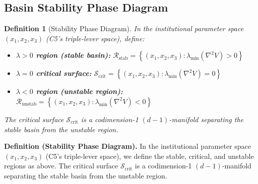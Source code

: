 \documentclass[12pt,a4paper]{article}
\newtheorem{definition}[theorem]{Definition}
\theoremstyle{definition}
\newcommand{\set}[1]{\left\{#1\right\}}
\newcommand{\calR}{\mathcal{R}}
\newcommand{\calS}{\mathcal{S}}
\newcommand{\lb}{\lambda}
\newcommand{\lambdamin}{\lambda_{\min}}
\newcommand{\Lyap}{V}
\begin{document}
\subsection{Basin Stability Phase Diagram}
\label{sec:phase_diagram}

\begin{definition}[Stability Phase Diagram]
\label{def:phase_diagram}
In the institutional parameter space $(x_1, x_2, x_3)$ (C5's triple-lever space), define:
\begin{itemize}
    \item \textbf{$\lb>0$ region (stable basin):} $\calR_{\text{stab}} = \set{(x_1, x_2, x_3) : \lambdamin(\nabla^2 \Lyap) > 0}$
    \item \textbf{$\lb=0$ critical surface:} $\calS_{\text{crit}} = \set{(x_1, x_2, x_3) : \lambdamin(\nabla^2 \Lyap) = 0}$
    \item \textbf{$\lb<0$ region (unstable region):} $\calR_{\text{unstab}} = \set{(x_1, x_2, x_3) : \lambdamin(\nabla^2 \Lyap) < 0}$
\end{itemize}
The critical surface $\calS_{\text{crit}}$ is a codimension-1 $(d-1)$-manifold separating the stable basin from the unstable region.
\end{definition}

\noindent
\textbf{Definition (Stability Phase Diagram).}
In the institutional parameter space $(x_1, x_2, x_3)$ (C5's triple-lever space), we define the stable, critical, and unstable regions as above. The critical surface $\calS_{\text{crit}}$ is a codimension-1 $(d-1)$-manifold separating the stable basin from the unstable region.
\end{document}
